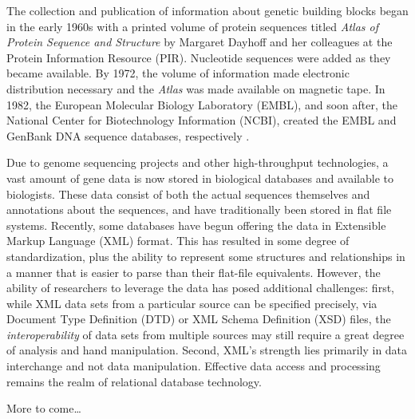 \documentclass[10pt]{bmc_article}
\newenvironment{bmcformat}{\begin{raggedright}\baselineskip20pt\sloppy\setboolean{publ}{false}}{\end{raggedright}\baselineskip20pt\sloppy}
\begin{document}
\begin{bmcformat}
The collection and publication of information about genetic building blocks began in the early 1960s with a printed volume of protein sequences titled \emph{Atlas of Protein Sequence and Structure} by Margaret Dayhoff and her colleagues at the Protein Information Resource (PIR).  Nucleotide sequences were added as they became available.  By 1972, the volume of information made electronic distribution necessary and the \emph{Atlas} was made available on magnetic tape.  In 1982, the European Molecular Biology Laboratory (EMBL), and soon after, the National Center for Biotechnology Information (NCBI), created the EMBL and GenBank DNA sequence databases, respectively \cite{baxevanis:ch1}.\pb

Due to genome sequencing projects and other high-throughput technologies, a vast amount of gene data is now stored in biological databases and available to biologists.  These data consist of both the actual sequences themselves and annotations about the sequences, and have traditionally been stored in flat file systems.  Recently, some databases have begun offering the data in Extensible Markup Language (XML) format.  This has resulted in some degree of standardization, plus the ability to represent some structures and relationships in a manner that is easier to parse than their flat-file equivalents.  However, the ability of researchers to leverage the data has posed additional challenges: first, while XML data sets from a particular source can be specified precisely, via Document Type Definition (DTD) or XML Schema Definition (XSD) files, the \emph{interoperability} of data sets from multiple sources may still require a great degree of analysis and hand manipulation.  Second, XML's strength lies primarily in data interchange and not data manipulation.  Effective data access and processing remains the realm of relational database technology.\pb

More to come\ldots\pb




\end{bmcformat}
\end{document}
